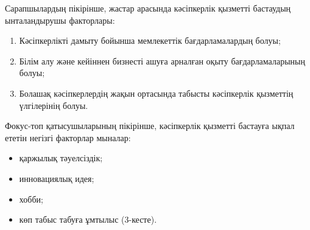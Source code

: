 
\begin{multicols}{2}

Сарапшылардың пікірінше, жастар арасында кәсіпкерлік қызметті бастаудың
ынталандырушы факторлары:

\begin{enumerate}
\def\labelenumi{\arabic{enumi}.}
\item
  Кәсіпкерлікті дамыту бойынша мемлекеттік бағдарламалардың болуы;
\item
  Білім алу және кейіннен бизнесті ашуға арналған оқыту
  бағдарламаларының болуы;
\item
  Болашақ кәсіпкерлердің жақын ортасында табысты кәсіпкерлік қызметтің
  үлгілерінің болуы.
\end{enumerate}

Фокус-топ қатысушыларының пікірінше, кәсіпкерлік қызметті бастауға ықпал
ететін негізгі факторлар мыналар:

\begin{itemize}
\item
  қаржылық тәуелсіздік;
\item
  инновациялық идея;
\item
  хобби;
\item
  көп табыс табуға ұмтылыс (3-кесте).
\end{itemize}
\end{multicols}

